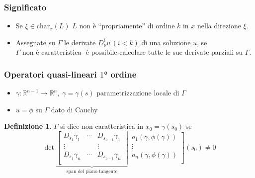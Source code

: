 \documentclass[serif,notheorems]{beamer}
\theoremstyle{definition} %
\newtheorem{definition}{Definizione}[section] %
\theoremstyle{remark}
\begin{document}
\begin{frame}
\frametitle{Significato}
\begin{itemize}
\item Se
$\xi \in \text{char}_x (L)$
$L$ non è ``propriamente'' di ordine $k$ in $x$ nella direzione $\xi$.
\vspace{5mm}
\item Assegnate su $\Gamma$ le derivate $D^i_\nu u \,(i<k)$ di una soluzione $u$, se
$\Gamma \text{ non è caratteristica }$
è possibile calcolare tutte le sue derivate parziali su $\Gamma$.
\end{itemize}
\end{frame}

\begin{frame}
\frametitle{Operatori quasi-lineari $1$° ordine}
\begin{itemize}
\item $\gamma: \mathbb{R}^{n-1}\rightarrow \mathbb{R}^n, \; \gamma = \gamma (s)$ parametrizzazione locale di $\Gamma$
\item $u = \phi$ su $\Gamma$ dato di Cauchy
\end{itemize}
\begin{definition}
$\Gamma$ si dice non caratteristica in $x_0=\gamma (s_0)$ se\\
\begin{equation*}
\det
\underbrace{
\left[
\begin{matrix}
D_{s_1}\gamma_1 & \cdots & D_{s_{n-1}}\gamma_1 \\
\vdots &  & \vdots \\
D_{s_1}\gamma_n & \cdots & D_{s_{n-1}}\gamma_n \\
\end{matrix}\;\right|}_{\text{span del piano tangente}} \,
\left.
\begin{matrix}
a_1(\gamma, \phi(\gamma))\\
\vdots\\
a_n(\gamma, \phi(\gamma))\\
\end{matrix}\right] (s_0) \neq 0
\end{equation*}
\end{definition}
\end{frame}
\end{document}
